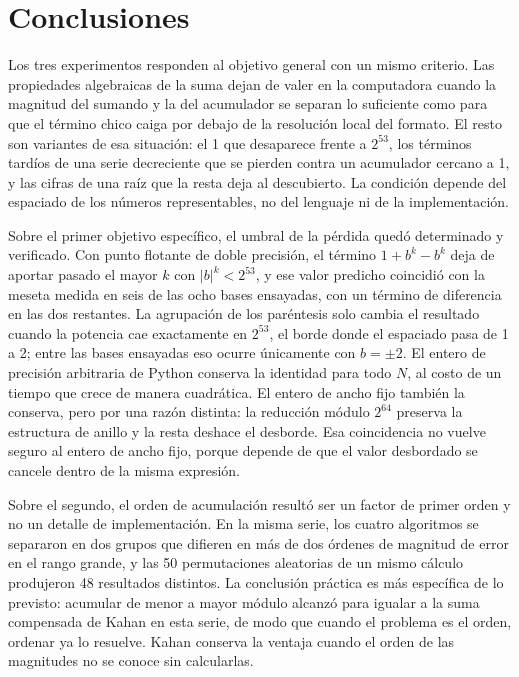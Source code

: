 \section{Conclusiones}
\label{sec:conclusiones}

Los tres experimentos responden al objetivo general con un mismo criterio. Las propiedades
algebraicas de la suma dejan de valer en la computadora cuando la magnitud del sumando y la del
acumulador se separan lo suficiente como para que el término chico caiga por debajo de la resolución
local del formato. El resto son variantes de esa situación: el 1 que desaparece frente a $2^{53}$,
los términos tardíos de una serie decreciente que se pierden contra un acumulador cercano a 1, y las
cifras de una raíz que la resta deja al descubierto. La condición depende del espaciado de los
números representables, no del lenguaje ni de la implementación.

Sobre el primer objetivo específico, el umbral de la pérdida quedó determinado y verificado. Con
punto flotante de doble precisión, el término $1 + b^{k} - b^{k}$ deja de aportar pasado el mayor
$k$ con $|b|^{k} < 2^{53}$, y ese valor predicho coincidió con la meseta medida en seis de las ocho
bases ensayadas, con un término de diferencia en las dos restantes.
La agrupación de los paréntesis solo cambia el resultado cuando la potencia cae exactamente en
$2^{53}$, el borde donde el espaciado pasa de 1 a 2; entre las bases ensayadas eso ocurre
únicamente con $b = \pm 2$. El
entero de precisión arbitraria de Python conserva la identidad para todo $N$, al costo de un tiempo
que crece de manera cuadrática. El entero de ancho fijo también la conserva, pero por una razón
distinta: la reducción módulo $2^{64}$ preserva la estructura de anillo y la resta deshace el
desborde. Esa coincidencia no vuelve seguro al entero de ancho fijo, porque depende de que el valor
desbordado se cancele dentro de la misma expresión.

Sobre el segundo, el orden de acumulación resultó ser un factor de primer orden y no un detalle de
implementación. En la misma serie, los cuatro algoritmos se separaron en dos grupos que difieren en
más de dos órdenes de magnitud de error en el rango grande, y las 50 permutaciones aleatorias de un
mismo cálculo produjeron
48 resultados distintos. La conclusión práctica es más específica de lo previsto:
acumular de menor a mayor módulo alcanzó para igualar a la suma compensada de Kahan en esta serie,
de modo que cuando el problema es el orden, ordenar ya lo resuelve. Kahan conserva la ventaja
cuando el orden de las magnitudes no se conoce sin calcularlas.

